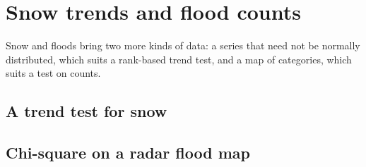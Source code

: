 \chapter{Snow trends and flood counts}\label{ch:trendscounts}
Snow and floods bring two more kinds of data: a series that need not be normally distributed, which suits a rank-based trend test, and a map of categories, which suits a test on counts.

\section{A trend test for snow}

\section{Chi-square on a radar flood map}

